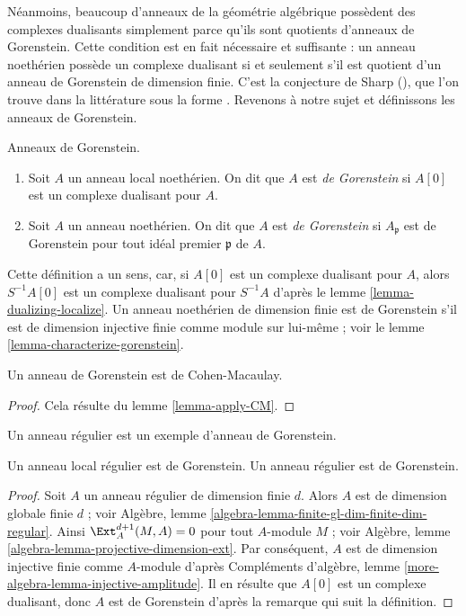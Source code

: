 \medskip\noindent
Néanmoins, beaucoup d'anneaux de la géométrie algébrique possèdent
des complexes dualisants simplement parce qu'ils sont quotients
d'anneaux de Gorenstein. Cette condition est en fait nécessaire et suffisante :
un anneau noethérien possède un complexe dualisant si et seulement s'il est
quotient d'un anneau de Gorenstein de dimension finie.
C'est la conjecture de Sharp (\cite{Sharp}), que l'on trouve dans la littérature
sous la forme \cite[corollaire 1.4]{Kawasaki}. Revenons à notre sujet et définissons les anneaux de Gorenstein.

\begin{definition}
\label{definition-gorenstein}
Anneaux de Gorenstein.
\begin{enumerate}
\item Soit $A$ un anneau local noethérien. On dit que $A$ est
{\it de Gorenstein} si $A[0]$ est un complexe dualisant pour $A$.
\item Soit $A$ un anneau noethérien. On dit que $A$ est
{\it de Gorenstein} si $A_\mathfrak p$ est de Gorenstein
pour tout idéal premier $\mathfrak p$ de $A$.
\end{enumerate}
\end{definition}

\noindent
Cette définition a un sens, car, si $A[0]$ est un complexe dualisant
pour $A$, alors $S^{-1}A[0]$ est un complexe dualisant pour $S^{-1}A$
d'après le lemme \ref{lemma-dualizing-localize}.
Un anneau noethérien de dimension finie est de Gorenstein
s'il est de dimension injective finie comme module sur lui-même ;
voir le lemme \ref{lemma-characterize-gorenstein}.

\begin{lemma}
\label{lemma-gorenstein-CM}
Un anneau de Gorenstein est de Cohen-Macaulay.
\end{lemma}

\begin{proof}
Cela résulte du lemme \ref{lemma-apply-CM}.
\end{proof}

\noindent
Un anneau régulier est un exemple d'anneau de Gorenstein.

\begin{lemma}
\label{lemma-regular-gorenstein}
Un anneau local régulier est de Gorenstein.
Un anneau régulier est de Gorenstein.
\end{lemma}

\begin{proof}
Soit $A$ un anneau régulier de dimension finie $d$.
Alors $A$ est de dimension globale finie $d$ ; voir Algèbre, lemme \ref{algebra-lemma-finite-gl-dim-finite-dim-regular}.
Ainsi $\Ext^{d + 1}_A(M, A) = 0$ pour tout $A$-module $M$ ; voir Algèbre, lemme \ref{algebra-lemma-projective-dimension-ext}.
Par conséquent, $A$ est de dimension injective finie comme $A$-module
d'après Compléments d'algèbre, lemme \ref{more-algebra-lemma-injective-amplitude}.
Il en résulte que $A[0]$ est un complexe dualisant, donc $A$
est de Gorenstein d'après la remarque qui suit la définition.
\end{proof}

